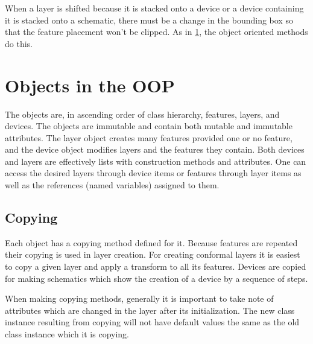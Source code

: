 \documentclass{article}
\begin{document}
When a layer is shifted because it is stacked onto a device or a device containing it is stacked onto a schematic, there must be a change in the bounding box so that the feature placement won't be clipped. As in \ref{sec:oop}, the object oriented methods do this.

\section{Objects in the OOP}\label{sec:oop}
The objects are, in ascending order of class hierarchy, features, layers, and devices. The objects are immutable and contain both mutable and immutable attributes. The layer object creates many features provided one or no feature, and the device object modifies layers and the features they contain. Both devices and layers are effectively lists with construction methods and attributes. One can access the desired layers through device items or features through layer items as well as the references (named variables) assigned to them.

\subsection{Copying} 
Each object has a copying method defined for it. Because features are repeated their copying is used in layer creation. For creating conformal layers it is easiest to copy a given layer and apply a transform to all its features. Devices are copied for making schematics which show the creation of a device by a sequence of steps.

When making copying methods, generally it is important to take note of attributes which are changed in the layer after its initialization. The new class instance resulting from copying will not have default values the same as the old class instance which it is copying.

\end{document}

